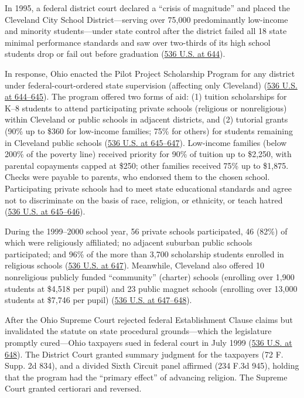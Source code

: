 \documentclass[12pt]{article}
\begin{document}
In 1995, a federal district court declared a ``crisis of magnitude'' and placed the Cleveland City School District---serving over 75,000 predominantly low-income and minority students---under state control after the district failed all 18 state minimal performance standards and saw over two-thirds of its high school students drop or fail out before graduation (\href{https://supreme.justia.com/cases/federal/us/536/639/}{536 U.S. at 644}).

In response, Ohio enacted the Pilot Project Scholarship Program for any district under federal-court-ordered state supervision (affecting only Cleveland) (\href{https://supreme.justia.com/cases/federal/us/536/639/}{536 U.S. at 644--645}). The program offered two forms of aid: (1) tuition scholarships for K--8 students to attend participating private schools (religious or nonreligious) within Cleveland or public schools in adjacent districts, and (2) tutorial grants (90\% up to \$360 for low-income families; 75\% for others) for students remaining in Cleveland public schools (\href{https://supreme.justia.com/cases/federal/us/536/639/}{536 U.S. at 645--647}). Low-income families (below 200\% of the poverty line) received priority for 90\% of tuition up to \$2,250, with parental copayments capped at \$250; other families received 75\% up to \$1,875. Checks were payable to parents, who endorsed them to the chosen school. Participating private schools had to meet state educational standards and agree not to discriminate on the basis of race, religion, or ethnicity, or teach hatred (\href{https://supreme.justia.com/cases/federal/us/536/639/}{536 U.S. at 645--646}).

During the 1999--2000 school year, 56 private schools participated, 46 (82\%) of which were religiously affiliated; no adjacent suburban public schools participated; and 96\% of the more than 3,700 scholarship students enrolled in religious schools (\href{https://supreme.justia.com/cases/federal/us/536/639/}{536 U.S. at 647}). Meanwhile, Cleveland also offered 10 nonreligious publicly funded ``community'' (charter) schools (enrolling over 1,900 students at \$4,518 per pupil) and 23 public magnet schools (enrolling over 13,000 students at \$7,746 per pupil) (\href{https://supreme.justia.com/cases/federal/us/536/639/}{536 U.S. at 647--648}).

After the Ohio Supreme Court rejected federal Establishment Clause claims but invalidated the statute on state procedural grounds---which the legislature promptly cured---Ohio taxpayers sued in federal court in July 1999 (\href{https://supreme.justia.com/cases/federal/us/536/639/}{536 U.S. at 648}). The District Court granted summary judgment for the taxpayers (72 F. Supp. 2d 834), and a divided Sixth Circuit panel affirmed (234 F.3d 945), holding that the program had the ``primary effect'' of advancing religion. The Supreme Court granted certiorari and reversed.
\end{document}
